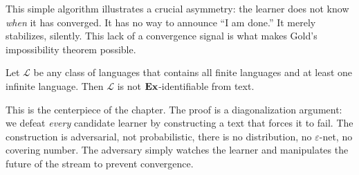 This simple algorithm illustrates a crucial asymmetry: the learner does not know \emph{when} it has converged. It has no way to announce ``I am done.'' It merely stabilizes, silently. This lack of a convergence signal is what makes Gold's impossibility theorem possible.

\begin{thm}
\label{thm:gold}
  \leanok
Let $\mathcal{L}$ be any class of languages that contains all finite languages and at least one infinite language. Then $\mathcal{L}$ is not $\mathbf{Ex}$-identifiable from text.
\end{thm}

This is the centerpiece of the chapter. The proof is a diagonalization argument: we defeat \emph{every} candidate learner by constructing a text that forces it to fail. The construction is adversarial, not probabilistic, there is no distribution, no $\varepsilon$-net, no covering number. The adversary simply watches the learner and manipulates the future of the stream to prevent convergence.


